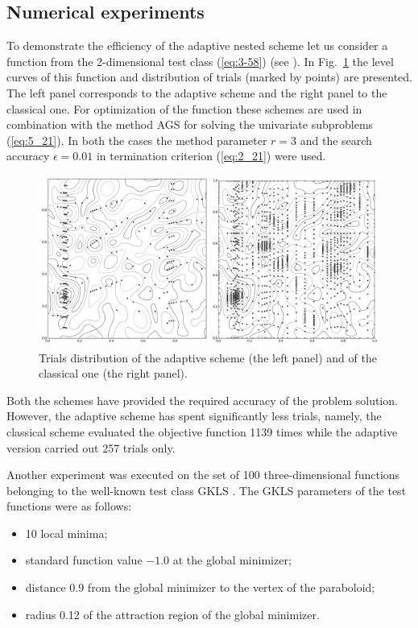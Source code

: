 \subsection {Numerical experiments}
\label{subsec:5_4_2}
To demonstrate the efficiency of the adaptive nested scheme let us consider a function from the 2-dimensional test class (\ref{eq:3-58}) (see \cite{5_GrishaginOperChar, 5_StrSergMon2000}). In Fig.~\ref{fig:5_10} the level curves of this function and distribution of trials (marked by points) are presented. The left panel corresponds to the adaptive scheme and the right panel to the classical one. For optimization of the function these schemes are used in combination with the method AGS for solving the univariate subproblems (\ref{eq:5_21}). In both the cases the method parameter $r=3$  and the search accuracy $\epsilon=0.01$ in termination criterion (\ref{eq:2_21}) were used.
\begin{figure}[ht]
\centering
\includegraphics[width=1.0\linewidth]{figures/figure_5_10.png}
\caption{Trials distribution of the adaptive scheme (the left panel) and of the classical one (the right panel).}
\label{fig:5_10}    
\end{figure}

Both the schemes have provided the required accuracy of the problem solution. However, the adaptive scheme has spent significantly less trials, namely, the classical scheme evaluated the objective function 1139 times while the adaptive version carried out 257 trials only.

Another experiment was executed \cite{5_GriIsrSergAMC} on the set of 100 three-dimensional functions belonging to the well-known test class GKLS \cite{5_GavianoKvasovLeraSergeyev}. The GKLS parameters of the test functions were as follows:
\begin{itemize}
\item {10 local minima;}
\item {standard function value $-1.0$ at the  global minimizer;}
\item{distance 0.9 from the global minimizer to the vertex of the paraboloid;}
\item{radius 0.12 of the attraction region of the global minimizer.}
\end{itemize}

